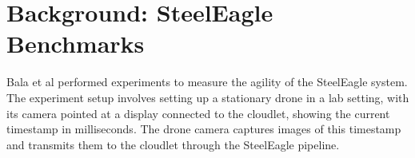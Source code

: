 \section{Background: SteelEagle Benchmarks}
Bala et al performed experiments to measure the agility of the SteelEagle
system. The experiment setup involves setting up a stationary drone in a lab
setting, with its camera pointed at a display connected to the cloudlet, showing
the current timestamp in milliseconds. The drone camera captures images of this
timestamp and transmits them to the cloudlet through the SteelEagle pipeline.

